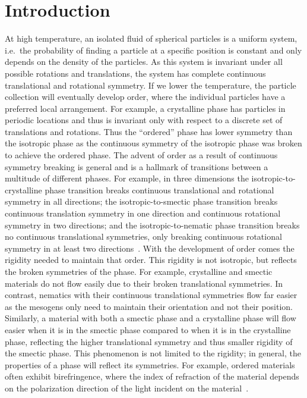 \chapter{Introduction}\label{c:1}
At high temperature, an isolated fluid of spherical particles is a uniform system, i.e.\ the probability of finding a particle at a specific position is constant and only depends on the density of the particles.
As this system is invariant under all possible rotations and translations, the system has complete continuous translational and rotational symmetry.
If we lower the temperature, the particle collection will eventually develop order, where the individual particles have a preferred local arrangement.
For example, a crystalline phase has particles in periodic locations and thus is invariant only with respect to a discrete set of translations and rotations.
Thus the ``ordered'' phase has lower symmetry than the isotropic phase as the continuous symmetry of the isotropic phase was broken to achieve the ordered phase.
The advent of order as a result of continuous symmetry breaking is general and is a hallmark of transitions between a multitude of different phases.
For example, in three dimensions the isotropic-to-crystalline phase transition breaks continuous translational and rotational symmetry in all directions; the isotropic-to-smectic phase transition breaks continuous translation symmetry in one direction and continuous rotational symmetry in two directions; and the isotropic-to-nematic phase transition breaks no continuous translational symmetries, only breaking continuous rotational symmetry in at least two directions~\cite{RN175}.
With the development of order comes the rigidity needed to maintain that order.
This rigidity is not isotropic, but reflects the broken symmetries of the phase.
For example, crystalline and smectic materials do not flow easily due to their broken translational symmetries.
In contrast, nematics with their continuous translational symmetries flow far easier as the mesogens only need to maintain their orientation and not their position.
Similarly, a material with both a smectic phase and a crystalline phase will flow easier when it is in the smectic phase compared to when it is in the crystalline phase, reflecting the higher translational symmetry and thus smaller rigidity of the smectic phase.
This phenomenon is not limited to the rigidity; in general, the properties of a phase will reflect its symmetries.
For example, ordered materials often exhibit birefringence, where the index of refraction of the material depends on the polarization direction of the light incident on the material~\cite{RN175}.

